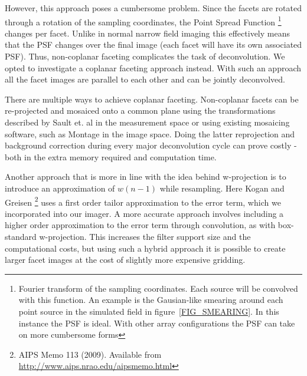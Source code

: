 \documentclass[a4paper,10pt]{article}
\begin{document}
However, this approach poses a cumbersome problem. Since the facets are rotated through a rotation of the sampling coordinates, 
the Point Spread Function \footnote {Fourier transform of the sampling coordinates. Each source will be convolved with this function.
An example is the Gausian-like smearing around each point source in the simulated field in figure~\ref{FIG_SMEARING}. In this instance
the PSF is ideal. With other array configurations the PSF can take on more cumbersome forms} changes per facet. Unlike in normal 
narrow field imaging this effectively means that the PSF changes over the final image (each facet will have its own associated PSF). Thus, 
non-coplanar faceting complicates the task of deconvolution. We opted to investigate a coplanar faceting approach instead. With such an approach all the facet images are parallel to 
each other and can be jointly deconvolved. 

There are multiple ways to achieve coplanar faceting. Non-coplanar facets can be
re-projected and mosaiced onto a common plane using the transformations described by Sault et. al \cite{sault1996approach} in the measurement space 
or using existing mosaicing software, such as Montage \cite{jacob2004montage} in the image space. Doing the latter reprojection and 
background correction during every major deconvolution cycle can prove costly - both in the extra memory required and 
computation time.

Another approach that is more in line with the idea behind w-projection is to introduce an approximation of $w(n-1)$ while resampling.
Here Kogan and Greisen \footnote{AIPS Memo 113 (2009). Available from \url{http://www.aips.nrao.edu/aipsmemo.html}} uses a first order
tailor approximation to the error term, which we incorporated into our imager. A more accurate approach involves including a higher
order approximation to the error term through convolution, as with box-standard w-projection. This increases the filter support size and the 
computational costs, but using such a hybrid approach it is possible to create larger facet images at the cost of slightly more
expensive gridding.
\end{document}
